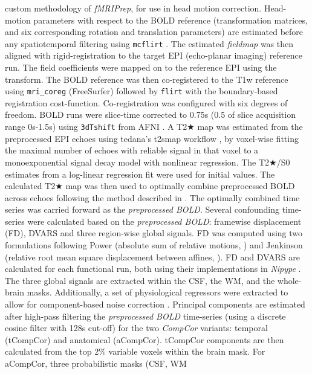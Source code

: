 \documentclass[
]{article}
\begin{document}
\begin{description}
custom methodology of \emph{fMRIPrep}, for use in head motion
correction. Head-motion parameters with respect to the BOLD reference
(transformation matrices, and six corresponding rotation and translation
parameters) are estimated before any spatiotemporal filtering using
\texttt{mcflirt} \citep[FSL ,][]{mcflirt}. The estimated \emph{fieldmap}
was then aligned with rigid-registration to the target EPI (echo-planar
imaging) reference run. The field coefficients were mapped on to the
reference EPI using the transform. The BOLD reference was then
co-registered to the T1w reference using \texttt{mri\_coreg}
(FreeSurfer) followed by \texttt{flirt} \citep[FSL ,][]{flirt} with the
boundary-based registration \citep{bbr} cost-function. Co-registration
was configured with six degrees of freedom. BOLD runs were slice-time
corrected to 0.75s (0.5 of slice acquisition range 0s-1.5s) using
\texttt{3dTshift} from AFNI \citep[RRID:SCR\_005927]{afni}. A T2★ map
was estimated from the preprocessed EPI echoes using tedana's t2smap
workflow \citep{DuPre2021}, by voxel-wise fitting the maximal number of
echoes with reliable signal in that voxel to a monoexponential signal
decay model with nonlinear regression. The T2★/S0 estimates from a
log-linear regression fit were used for initial values. The calculated
T2★ map was then used to optimally combine preprocessed BOLD across
echoes following the method described in \citep{posse_t2s}. The
optimally combined time series was carried forward as the
\emph{preprocessed BOLD}. Several confounding time-series were
calculated based on the \emph{preprocessed BOLD}: framewise displacement
(FD), DVARS and three region-wise global signals. FD was computed using
two formulations following Power (absolute sum of relative motions,
\citet{power_fd_dvars}) and Jenkinson (relative root mean square
displacement between affines, \citet{mcflirt}). FD and DVARS are
calculated for each functional run, both using their implementations in
\emph{Nipype} \citep[following the definitions by][]{power_fd_dvars}.
The three global signals are extracted within the CSF, the WM, and the
whole-brain masks. Additionally, a set of physiological regressors were
extracted to allow for component-based noise correction
\citep[\emph{CompCor},][]{compcor}. Principal components are estimated
after high-pass filtering the \emph{preprocessed BOLD} time-series
(using a discrete cosine filter with 128s cut-off) for the two
\emph{CompCor} variants: temporal (tCompCor) and anatomical (aCompCor).
tCompCor components are then calculated from the top 2\% variable voxels
within the brain mask. For aCompCor, three probabilistic masks (CSF, WM

\end{description}
\end{document}
